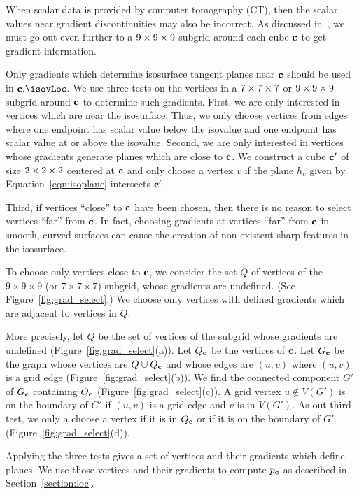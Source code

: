 When scalar data is provided by computer tomography (CT),
then the scalar values near gradient discontinuities
may also be incorrect.
As discussed in~\cite{bw-crgsd-15},
we must go out even further to a $9 \times 9 \times 9$ subgrid 
around each cube $\mathbf{c}$ to get gradient information.

Only gradients which determine isosurface tangent planes near $\mathbf{c}$
should be used in $\cb.\isovLoc$.
We use three tests on the vertices in a $7 \times 7 \times 7$ or $9 \times 9 \times 9$
subgrid around $\mathbf{c}$ to determine such gradients.
First, we are only interested in vertices which are near the isosurface.
Thus, we only choose vertices from edges
where one endpoint has scalar value below
the isovalue and one endpoint has scalar value at or above the isovalue.
Second, we are only interested in vertices whose gradients generate planes
which are close to $\mathbf{c}$.
We construct a cube $\mathbf{c}'$ of size $2 \times 2 \times 2$ centered at $\mathbf{c}$
and only choose a vertex $v$ 
if the plane $h_v$ given by Equation~\ref{eqn:isoplane}
intersects $\mathbf{c}'$.

Third, if vertices ``close'' to $\mathbf{c}$ have been chosen,
then there is no reason to select vertices ``far'' from $\mathbf{c}$.
In fact, choosing gradients at vertices ``far'' from $\mathbf{c}$
in smooth, curved surfaces can cause the creation 
of non-existent sharp features in the isosurface.

To choose only vertices close to $\mathbf{c}$,
we consider the set $Q$ of vertices 
of the $9 \times 9 \times 9$ (or $7 \times 7 \times 7$) subgrid,
whose gradients are undefined.
(See Figure~\ref{fig:grad_select}.)
We choose only vertices with defined gradients
which are adjacent to vertices in $Q$.

More precisely, let $Q$ be the set of vertices of the subgrid
whose gradients are undefined (Figure~\ref{fig:grad_select}(a)).
Let $Q_{\mathbf{c}}$ be the vertices of $\mathbf{c}$.
Let $G_{\mathbf{c}}$ be the graph whose vertices are $Q \cup Q_{\mathbf{c}}$
and whose edges are $(u,v)$ where $(u,v)$ is a grid edge
(Figure~\ref{fig:grad_select}(b)).
We find the connected component $G'$ of $G_{\mathbf{c}}$ containing $Q_{\mathbf{c}}$
(Figure~\ref{fig:grad_select}(c)).
A grid vertex $u \not\in V(G')$ is on the boundary of $G'$
if $(u,v)$ is a grid edge and $v$ is in $V(G')$.
As out third test, we only a choose a vertex if it is in $Q_{\mathbf{c}}$
or if it is on the boundary of $G'$.
(Figure~\ref{fig:grad_select}(d)).

Applying the three tests gives a set of vertices and their gradients
which define planes.
We use those vertices and their gradients to compute $p_{\mathbf{c}}$
as described in Section~\ref{section:loc}.


